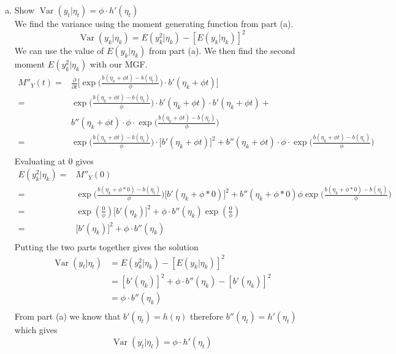 \documentclass{article}
\newcommand{\pd}[2]{\frac{\partial#1}{\partial#2}}
\newcommand{\var}{\mathop{\mathrm{Var}}}
\begin{document}
\begin{enumerate}[(a)]
\item Show $\var(y_t|\eta_t) = \phi\cdot h'(\eta_t)$\\
We find the variance using the moment generating function from part (a).
$$\var(y_k|\eta_k) = E(y^2_k|\eta_k) - [E(y_k|\eta_k)]^2$$
We can use the value of $E(y_k|\eta_k)$ from part (a). We then find the second moment $E(y^2_k|\eta_k)$ with our MGF.
\begin{align*}
M''_Y(t) =& \pd{}{t} \bigg[\exp\bigg(\frac{b(\eta_k + \phi t) - b(\eta_t)}{\phi}\bigg)\cdot b'(\eta_k + \phi t)\bigg]\\
=& \exp\bigg(\frac{b(\eta_k + \phi t) - b(\eta_t)}{\phi}\bigg)\cdot b'(\eta_k + \phi t)\cdot b'(\eta_k + \phi t) +\\
& b''(\eta_k + \phi t)\cdot\phi\cdot\exp\bigg(\frac{b(\eta_k + \phi t) - b(\eta_t)}{\phi}\bigg)\\
=& \exp\bigg(\frac{b(\eta_k + \phi t) - b(\eta_t)}{\phi}\bigg)\cdot \bigg[b'(\eta_k + \phi t)\bigg]^2 + b''(\eta_k + \phi t)\cdot\phi\cdot\exp\bigg(\frac{b(\eta_k + \phi t) - b(\eta_t)}{\phi}\bigg)\\
\end{align*}
Evaluating at 0 gives
\begin{align*}
 E(y^2_k|\eta_k) =& M''_Y(0)\\
=& \exp\bigg(\frac{b(\eta_k + \phi *0) - b(\eta_t)}{\phi}\bigg)\bigg[b'(\eta_k + \phi *0)\bigg]^2 + b''(\eta_k + \phi *0)\phi\exp\bigg(\frac{b(\eta_k + \phi *0) - b(\eta_t)}{\phi}\bigg)\\
=& \exp(\frac{0}{\phi})\bigg[b'(\eta_k)\bigg]^2 + \phi \cdot b''(\eta_k)\exp(\frac{0}{\phi})\\
=& \bigg[b'(\eta_k)\bigg]^2 + \phi \cdot b''(\eta_k)\\
\end{align*}
Putting the two parts together gives the solution
\begin{align*}
\var(y_t|\eta_t) &= E(y^2_k|\eta_k) -  [E(y_k|\eta_k)]^2\\
&= [b'(\eta_k)]^2 + \phi \cdot b''(\eta_k) -  [b'(\eta_k)]^2\\
&= \phi \cdot b''(\eta_k)\\
\end{align*}
From part (a) we know that $b'(\eta_t) = h(\eta)$ therefore $b''(\eta_t) = h'(\eta_t)$ which gives
$$\var(y_t|\eta_t) = \phi\cdot h'(\eta_t)$$


\end{enumerate}
\end{document}
